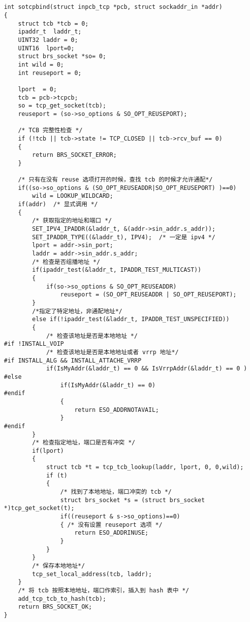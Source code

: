 ﻿\documentclass  [11pt,twocolumn]{article}
\begin{document}
\subsection{}
\begin{lstlisting}
int sotcpbind(struct inpcb_tcp *pcb, struct sockaddr_in *addr)
{
    struct tcb *tcb = 0;
    ipaddr_t  laddr_t;
    UINT32 laddr = 0;
    UINT16  lport=0;
    struct brs_socket *so= 0;
    int wild = 0;
    int reuseport = 0;
	
    lport  = 0;
    tcb = pcb->tcpcb;
    so = tcp_get_socket(tcb);
    reuseport = (so->so_options & SO_OPT_REUSEPORT);
	
    /* TCB 完整性检查 */
    if (!tcb || tcb->state != TCP_CLOSED || tcb->rcv_buf == 0)
    {
        return BRS_SOCKET_ERROR;
    }

    /* 只有在没有 reuse 选项打开的时候，查找 tcb 的时候才允许通配*/
    if((so->so_options & (SO_OPT_REUSEADDR|SO_OPT_REUSEPORT) )==0)
		wild = LOOKUP_WILDCARD;
    if(addr)  /* 显式调用 */
    {
        /* 获取指定的地址和端口 */
        SET_IPV4_IPADDR(&laddr_t, &(addr->sin_addr.s_addr));
        SET_IPADDR_TYPE((&laddr_t), IPV4);  /* 一定是 ipv4 */
        lport = addr->sin_port;
        laddr = addr->sin_addr.s_addr;
        /* 检查是否组播地址 */
        if(ipaddr_test(&laddr_t, IPADDR_TEST_MULTICAST))
        {
            if(so->so_options & SO_OPT_REUSEADDR)
                reuseport = (SO_OPT_REUSEADDR | SO_OPT_REUSEPORT);
        }
        /*指定了特定地址，非通配地址*/
        else if(!ipaddr_test(&laddr_t, IPADDR_TEST_UNSPECIFIED)) 
        {
            /* 检查该地址是否是本地地址 */
#if !INSTALL_VOIP 
            /* 检查该地址是否是本地地址或者 vrrp 地址*/
#if INSTALL_ALG && INSTALL_ATTACHE_VRRP
            if(IsMyAddr(&laddr_t) == 0 && IsVrrpAddr(&laddr_t) == 0 )
#else
                if(IsMyAddr(&laddr_t) == 0)
#endif
                {
                    return ESO_ADDRNOTAVAIL;
                }
#endif  
        } 
        /* 检查指定地址，端口是否有冲突 */
        if(lport)
        {
            struct tcb *t = tcp_tcb_lookup(laddr, lport, 0, 0,wild);
            if (t)
            {
                /* 找到了本地地址，端口冲突的 tcb */
                struct brs_socket *s = (struct brs_socket *)tcp_get_socket(t);
                if((reuseport & s->so_options)==0)
                { /* 没有设置 reuseport 选项 */
                    return ESO_ADDRINUSE;
                }
            }	        
        }
        /* 保存本地地址*/
        tcp_set_local_address(tcb, laddr);
    }
    /* 将 tcb 按照本地地址，端口作索引，插入到 hash 表中 */
    add_tcp_tcb_to_hash(tcb);
    return BRS_SOCKET_OK;
}
\end{lstlisting}
\end{document}
